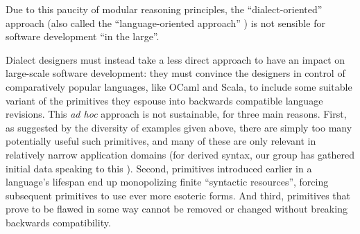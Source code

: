 Due to this paucity of modular reasoning principles, the ``dialect-oriented'' approach (also called the ``language-oriented approach'' \cite{journals/stp/Ward94}) is not sensible for software development ``in the large''. %

Dialect designers must instead take a less direct approach to have an impact on large-scale software development: they must convince the designers in control of comparatively popular languages, like OCaml and Scala, to include some suitable variant of the primitives they espouse into backwards compatible language revisions. %
This \emph{ad hoc} approach is not sustainable, for three main reasons. First, as suggested by the diversity of examples given above, there are simply too  many potentially useful such primitives, and many of these are only relevant in relatively narrow application domains (for derived syntax, our group has  gathered initial data speaking to this \cite{TSLs}). Second, primitives introduced earlier in a language's lifespan end up monopolizing finite ``syntactic resources'', forcing subsequent primitives to use ever more esoteric forms. And third, primitives that prove to be flawed in some way cannot be removed or changed without breaking backwards compatibility. %
